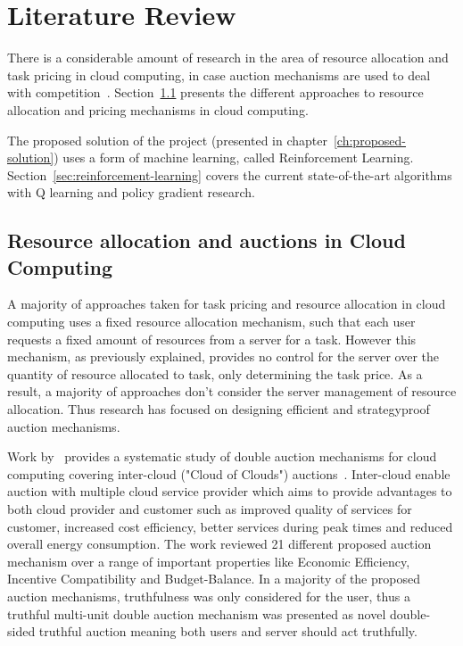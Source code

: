 \chapter{Literature Review}\label{ch:literature-review}
There is a considerable amount of research in the area of resource allocation and task pricing in cloud computing,
in case auction mechanisms are used to deal with competition~\citep{KUMAR2017234,Zhang2017,Du2019,Bi2019}.
Section~\ref{sec:resource-allocation-and-auctions-in-cloud-computing} presents the different approaches to resource
allocation and pricing mechanisms in cloud computing.

The proposed solution of the project (presented in chapter~\ref{ch:proposed-solution}) uses a form of
machine learning, called Reinforcement Learning. Section~\ref{sec:reinforcement-learning} covers the current
state-of-the-art algorithms with Q learning and policy gradient research.

\section{Resource allocation and auctions in Cloud Computing}\label{sec:resource-allocation-and-auctions-in-cloud-computing}
A majority of approaches taken for task pricing and resource allocation in cloud computing uses a fixed resource
allocation mechanism, such that each user requests a fixed amount of resources from a server for a task. However this
mechanism, as previously explained, provides no control for the server over the quantity of resource allocated to task,
only determining the task price. As a result, a majority of approaches don't consider the server management of resource
allocation. Thus research has focused on designing efficient and strategyproof auction mechanisms.

Work by~\cite{KUMAR2017234} provides a systematic study of double auction mechanisms for cloud computing covering
inter-cloud ("Cloud of Clouds") auctions~\citep{interclouds}. Inter-cloud enable auction with multiple cloud service
provider which aims to provide advantages to both cloud provider and customer such as improved quality of services for
customer, increased cost efficiency, better services during peak times and reduced overall energy consumption.
The work reviewed 21 different proposed auction mechanism over a range of important properties like Economic Efficiency,
Incentive Compatibility and Budget-Balance. In a majority of the proposed auction mechanisms, truthfulness was only
considered for the user, thus a truthful multi-unit double auction mechanism was presented as novel double-sided
truthful auction meaning both users and server should act truthfully.


